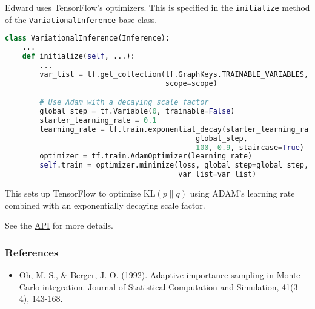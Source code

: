 Edward uses TensorFlow's optimizers.
This is specified in the \texttt{initialize} method of the
\texttt{VariationalInference} base class.

\begin{lstlisting}[language=Python]
class VariationalInference(Inference):
    ...
    def initialize(self, ...):
        ...
        var_list = tf.get_collection(tf.GraphKeys.TRAINABLE_VARIABLES,
                                     scope=scope)

        # Use Adam with a decaying scale factor
        global_step = tf.Variable(0, trainable=False)
        starter_learning_rate = 0.1
        learning_rate = tf.train.exponential_decay(starter_learning_rate,
                                            global_step,
                                            100, 0.9, staircase=True)
        optimizer = tf.train.AdamOptimizer(learning_rate)
        self.train = optimizer.minimize(loss, global_step=global_step,
                                        var_list=var_list)
\end{lstlisting}

This sets up TensorFlow to optimize $\text{KL}(p\|q)$ using ADAM's
learning rate combined with an exponentially decaying scale factor.

See the \href{api/index.html}{API} for more details.

\subsubsection{References}\label{references}

\begin{itemize}
\item
  Oh, M. S., & Berger, J. O. (1992). Adaptive importance sampling in
  Monte Carlo integration. Journal of Statistical Computation and
  Simulation, 41(3-4), 143-168.
\end{itemize}
